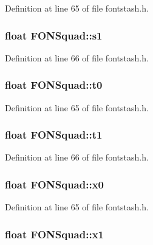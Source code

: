 Definition at line 65 of file fontstash.\+h.

\hypertarget{struct_f_o_n_squad_a25bd9940964ba17228ad1eea3f305c46}{
\subsubsection[{s1}]{\setlength{\rightskip}{0pt plus 5cm}float F\+O\+N\+Squad\+::s1}}\label{struct_f_o_n_squad_a25bd9940964ba17228ad1eea3f305c46}


Definition at line 66 of file fontstash.\+h.

\hypertarget{struct_f_o_n_squad_ab9a0182a9c2d25c165f11fffeb56b130}{
\subsubsection[{t0}]{\setlength{\rightskip}{0pt plus 5cm}float F\+O\+N\+Squad\+::t0}}\label{struct_f_o_n_squad_ab9a0182a9c2d25c165f11fffeb56b130}


Definition at line 65 of file fontstash.\+h.

\hypertarget{struct_f_o_n_squad_ab3c79f5439b37cf9c1eafa6d4f623ad9}{
\subsubsection[{t1}]{\setlength{\rightskip}{0pt plus 5cm}float F\+O\+N\+Squad\+::t1}}\label{struct_f_o_n_squad_ab3c79f5439b37cf9c1eafa6d4f623ad9}


Definition at line 66 of file fontstash.\+h.

\hypertarget{struct_f_o_n_squad_a3afad57cffbd1350a09f208c631a9813}{
\subsubsection[{x0}]{\setlength{\rightskip}{0pt plus 5cm}float F\+O\+N\+Squad\+::x0}}\label{struct_f_o_n_squad_a3afad57cffbd1350a09f208c631a9813}


Definition at line 65 of file fontstash.\+h.

\hypertarget{struct_f_o_n_squad_a6db320ddee76b1f2fefcb2c6b31b525d}{
\subsubsection[{x1}]{\setlength{\rightskip}{0pt plus 5cm}float F\+O\+N\+Squad\+::x1}}\label{struct_f_o_n_squad_a6db320ddee76b1f2fefcb2c6b31b525d}


